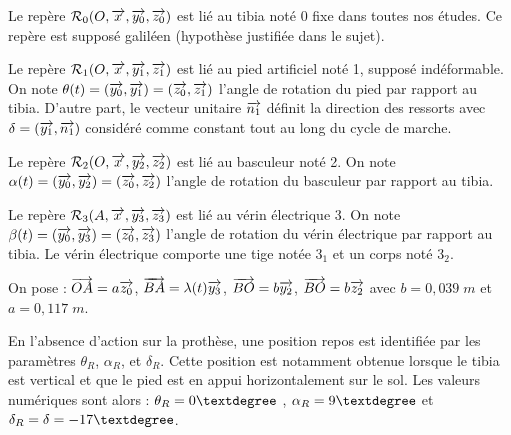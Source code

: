 \documentclass[10pt]{article}
\begin{document}
\begin{minipage}[c]{.54\linewidth}

Le repère $\mathcal{R}_{0} (O, \overrightarrow{x_{}},\overrightarrow{y_{0}} ,\overrightarrow{z_{0}})$ est lié au tibia noté 0 fixe dans toutes nos études. Ce repère est supposé galiléen (hypothèse justifiée dans le sujet).

Le repère $\mathcal{R}_{1} (O, \overrightarrow{x_{}},\overrightarrow{y_{1}} ,\overrightarrow{z_{1}} )$ est lié au pied artificiel noté 1, supposé indéformable. On note $\theta (t)=(\overrightarrow{y_{0}} ,\overrightarrow{y_{1}})=(\overrightarrow{z_{0}},\overrightarrow{z_{1}})$ l'angle de rotation du pied par rapport au tibia. D'autre part, le vecteur unitaire $\overrightarrow{n_1}$ définit la direction des ressorts avec $\delta=(\overrightarrow{y_{1}} ,\overrightarrow{n_1})$ considéré comme constant tout au long
du cycle de marche.

Le repère $\mathcal{R}_{2} (O, \overrightarrow{x_{}} ,\overrightarrow{y_{2}} ,\overrightarrow{z_{2}} )$ est lié au basculeur noté 2. On note $\alpha(t) =(\overrightarrow{y_{0}} ,\overrightarrow{y_{2}})=(\overrightarrow{z_{0}} ,\overrightarrow{z_{2}})$ l'angle de rotation du basculeur par rapport au tibia.

Le repère $\mathcal{R}_{3} ( A, \overrightarrow{x_{}},\overrightarrow{y_{3}} ,\overrightarrow{z_{3}})$ est lié au vérin électrique 3. On note $\beta(t )=(\overrightarrow{y_{0}} ,\overrightarrow{y_{3}})=(\overrightarrow{z_{0}} ,\overrightarrow{z_{3}})$ l'angle de rotation du vérin électrique par rapport au tibia. Le vérin électrique comporte une tige notée $3_1$ et un
corps noté $3_2$.

On pose : $\overrightarrow{OA}=a\overrightarrow{z_0}$, $\overrightarrow{BA}=\lambda(t)\overrightarrow{y_{3}}$, $\overrightarrow{BO}=b\overrightarrow{y_{2}}$, $\overrightarrow{BO} = b\overrightarrow{z_2}$ avec $b=0,039 \; m$ et $a=0,117\;m$.

En l'absence d'action sur la prothèse, une position repos est identifiée par les paramètres $\theta_R$, $\alpha_R$, et $\delta_R$. Cette position est notamment obtenue lorsque le tibia est vertical et que le pied est en appui horizontalement
sur le sol. Les valeurs numériques sont alors : $\theta_R=0\textdegree$ , $\alpha_R=9\textdegree$ et $\delta_R=\delta=-17\textdegree$.
\end{minipage} \hfill
\end{document}
